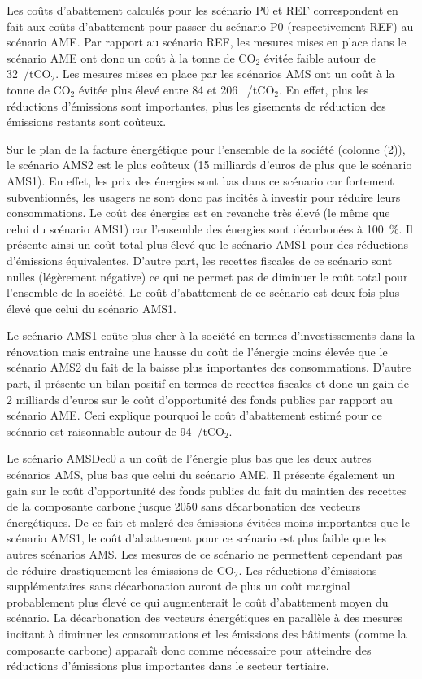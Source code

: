 \documentclass[10.5pt,a4paper]{article}
\def\euro{\mbox{\raisebox{.25ex}{{\it =}}\hspace{-.5em}{\sf C}}}
\begin{document}
{Les coûts d'abattement calculés pour les scénario P0 et REF correspondent en fait aux coûts d'abattement pour passer du scénario P0 (respectivement REF) au scénario AME. Par rapport au scénario REF, les mesures mises en place dans le scénario AME ont donc un coût à la tonne de CO$_2$ évitée faible autour de 32~\euro/tCO$_2$. Les mesures mises en place par les scénarios AMS ont un coût  à la tonne de CO$_2$ évitée plus élevé entre 84 et 206 ~\euro/tCO$_2$. En effet, plus les réductions d'émissions sont importantes, plus les gisements de réduction des émissions restants sont coûteux. 

Sur le plan de la facture énergétique pour l'ensemble de la société (colonne (2)), le scénario AMS2 est le plus coûteux (15 milliards d'euros de plus que le scénario AMS1). En effet, les prix des énergies sont bas dans ce scénario car fortement subventionnés, les usagers ne sont donc pas incités à investir pour réduire leurs consommations. Le coût des énergies est en revanche très élevé (le même que celui du scénario AMS1) car l'ensemble des énergies sont décarbonées à 100~\%. Il présente ainsi un coût total plus élevé que le scénario AMS1 pour des réductions d'émissions équivalentes. D'autre part, les recettes fiscales de ce scénario sont nulles (légèrement négative) ce qui ne permet pas de diminuer le coût total pour l'ensemble de la société. Le coût d'abattement de ce scénario est deux fois plus élevé que celui du scénario AMS1. 

Le scénario AMS1 coûte plus cher à la société en termes d'investissements dans la rénovation mais entraîne une hausse du coût de l'énergie moins élevée que le scénario AMS2 du fait de la baisse plus importantes des consommations. D'autre part, il présente un bilan positif en termes de recettes fiscales et donc un gain de 2 milliards d'euros sur le coût d'opportunité des fonds publics par rapport au scénario AME. Ceci explique pourquoi le coût d'abattement estimé pour ce scénario est raisonnable autour de 94~\euro/tCO$_2$. 

Le scénario AMSDec0 a un coût de l'énergie plus bas que les deux autres scénarios AMS, plus bas que celui du scénario AME. Il présente également un gain sur le coût d'opportunité des fonds publics du fait du maintien des recettes de la composante carbone jusque 2050 sans décarbonation des vecteurs énergétiques. De ce fait et malgré des émissions évitées moins importantes que le scénario AMS1, le coût d'abattement pour ce scénario est plus faible que les autres scénarios AMS. Les mesures de ce scénario ne permettent cependant pas de réduire drastiquement les émissions de CO$_2$. Les réductions d'émissions supplémentaires sans décarbonation auront de plus un coût marginal probablement plus élevé ce qui augmenterait le coût d'abattement moyen du scénario. La décarbonation des vecteurs énergétiques en parallèle à des mesures incitant à diminuer les consommations et les émissions des bâtiments (comme la composante carbone) apparaît donc comme nécessaire pour atteindre des réductions d'émissions plus importantes dans le secteur tertiaire. 

}
\end{document}
